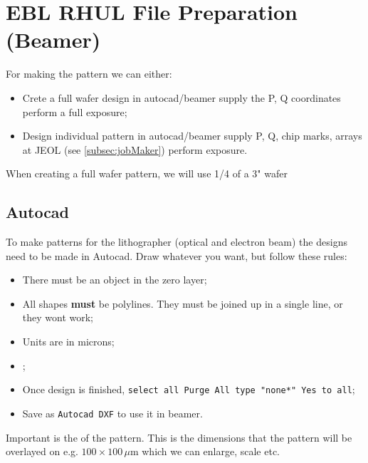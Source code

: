 
\section{EBL RHUL File Preparation (Beamer)
  \label{makeFile}}
For making the pattern we can either:
\begin{itemize}
\item Crete a full wafer design  in autocad/beamer \ira supply the P,
  Q coordinates \ira perform a full exposure;
\item Design individual  pattern in autocad/beamer \ira  supply P, Q,
  chip  marks, arrays  at JEOL  (see \autoref{subsec:jobMaker})  \ira
  perform exposure.
\end{itemize}

When creating  a full wafer  pattern, we will use  1/4 of a  3" wafer

 \subsection{Autocad}
 To make  patterns for the  lithographer (optical and  electron beam)
 the designs need to be made  in Autocad. Draw whatever you want, but
 follow these rules:

 \begin{itemize}
 \item There must be an object in the zero layer;
 \item All shapes \textbf{must} be  polylines. They must be joined up
   in a single line, or they wont work;
 \item Units are in microns;
 \item {};
 \item Once  design is finished,  \texttt{select all \ira  Purge \ira
     All \ira type "none*" \ira Yes to all};
 \item Save as \texttt{Autocad DXF} to use it in beamer.
 \end{itemize}

 \begin{framed}\noindent
   Important  is  the    of the  pattern.   This  is  the
   dimensions   that  the   pattern   will  be   overlayed  on   e.g.
   $ 100 \times 100\,\mu$m which we can enlarge, scale etc.

 \begin{center}
 \end{center}
\end{framed}

